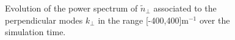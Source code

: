 \begin{figure}[H]
\begin{subfigure}[t]{0.45\textwidth}
		\label{fig:CIRC_evolutionKperp_flutter}
	\end{subfigure}
	\caption{Evolution of the power spectrum of $\tilde{n}_\perp$ associated to the perpendicular modes $k_\perp$ in the range [-400,400]m$^{-1}$ over the simulation time. }
	\label{fig:CIRC_evolutionKperp}
\end{figure}










